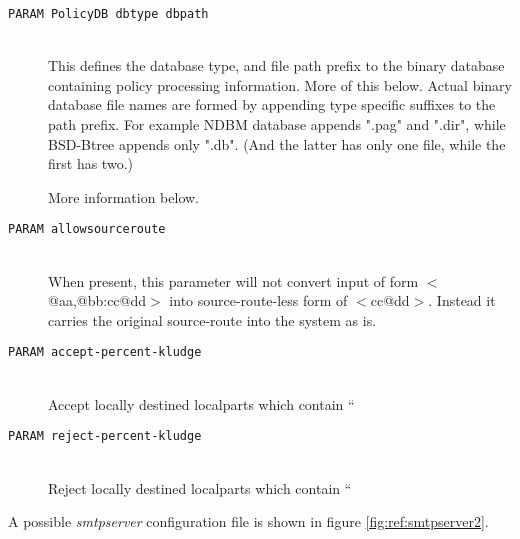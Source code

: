 \begin{description}
\item[\tt PARAM PolicyDB dbtype dbpath] \mbox{} \\
This defines the database type, and file path prefix to the binary
database containing policy processing information.  More of this
below.  Actual binary database file names are formed by appending
type specific suffixes to the path prefix.  For example NDBM
database appends ".pag" and ".dir", while BSD-Btree appends only
".db".  (And the latter has only one file, while the first has two.)

More information below.

\item[\tt PARAM allowsourceroute] \mbox{} \\
When present, this parameter will not convert input of form
{\(<\)@aa,@bb:cc@dd\(>\)} into source-route-less form of {\(<\)cc@dd\(>\)}.
Instead it carries the original source-route into the system as is.

\item[\tt PARAM accept-percent-kludge] \mbox{} \\
Accept locally destined localparts which contain ``%
\item[\tt PARAM reject-percent-kludge] \mbox{} \\
Reject locally destined localparts which contain ``%

\end{description}


A possible {\em smtpserver} configuration file is shown in figure
\vref{fig:ref:smtpserver2}.

